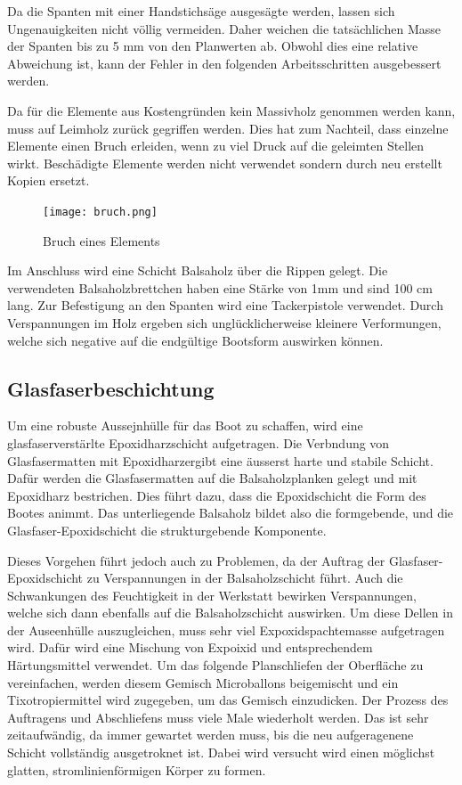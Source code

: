 Da die Spanten  mit einer Handstichsäge ausgesägte werden, lassen sich  Ungenauigkeiten nicht völlig vermeiden. Daher weichen die tatsächlichen Masse der Spanten bis zu 5 mm von den Planwerten ab. Obwohl dies eine relative Abweichung ist, kann der Fehler in den folgenden Arbeitsschritten ausgebessert werden. 

Da für die Elemente aus Kostengründen kein Massivholz genommen werden kann, muss auf Leimholz zurück gegriffen werden. Dies hat zum Nachteil, dass einzelne Elemente einen Bruch erleiden, wenn zu viel Druck auf die geleimten Stellen wirkt. Beschädigte Elemente werden nicht verwendet sondern durch neu  erstellt Kopien ersetzt. 
\begin{figure}[H]
    \centering
    \texttt{[image: bruch.png]}
    \caption{Bruch eines Elements}
    \label{fig:bruch}
\end{figure}

Im Anschluss wird eine Schicht Balsaholz über die Rippen gelegt. Die verwendeten Balsaholzbrettchen haben eine Stärke von 1mm und sind 100 cm lang. Zur Befestigung an den Spanten wird eine Tackerpistole verwendet. Durch Verspannungen im Holz ergeben sich unglücklicherweise kleinere Verformungen, welche sich negative auf die endgültige Bootsform auswirken können.

\subsection{Glasfaserbeschichtung}
Um eine robuste  Aussejnhülle für das Boot zu schaffen, wird eine glasfaserverstärlte Epoxidharzschicht  aufgetragen. Die Verbndung von Glasfasermatten mit Epoxidharzergibt eine äusserst harte und stabile Schicht.  Dafür  werden die Glasfasermatten auf die Balsaholzplanken gelegt und mit Epoxidharz bestrichen. Dies führt dazu, dass die Epoxidschicht die Form des Bootes animmt. Das unterliegende Balsaholz bildet also  die formgebende, und die Glasfaser-Epoxidschicht die  strukturgebende Komponente. 

Dieses Vorgehen führt jedoch auch zu Problemen, da der Auftrag der Glasfaser-Epoxidschicht zu Verspannungen in der Balsaholzschicht führt. Auch die Schwankungen des Feuchtigkeit in der Werkstatt bewirken Verspannungen, welche sich dann ebenfalls auf die Balsaholzschicht auswirken.  Um diese Dellen in der Auseenhülle auszugleichen, muss sehr viel Expoxidspachtemasse aufgetragen wird. Dafür wird eine Mischung von Expoixid und entsprechendem Härtungsmittel verwendet.  Um das folgende Planschliefen der Oberfläche zu vereinfachen, werden diesem Gemisch Microballons beigemischt und ein Tixotropiermittel wird zugegeben, um das Gemisch einzudicken. Der Prozess des Auftragens und Abschliefens muss  viele Male wiederholt werden. Das ist sehr zeitaufwändig, da immer gewartet werden muss, bis die neu aufgeragenene Schicht vollständig ausgetroknet ist.  Dabei wird  versucht wird einen möglichst glatten, stromlinienförmigen Körper zu formen.

